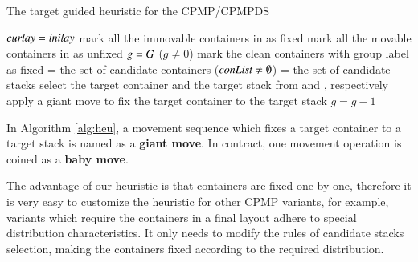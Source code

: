 \documentclass[review,3p,times,authoryear,12pt]{elsarticle}
\begin{document}
\begin{algorithm}[htbp]
	\caption{The target guided heuristic for the CPMP/CPMPDS}
	\label{alg:heu}
	\begin{codebox}
	\li $\id{curlay} = \id{inilay}$
    \li mark all the immovable containers in  as fixed
    \li mark all the movable containers in  as unfixed
    \li $\id{g} = G$
    \li \While ($g\neq0$)
    \li \Do
            mark the clean containers with group label  as fixed\label{heu:c}
    \li     {} = the set of candidate containers
    \li     \While($\id{conList} \neq \emptyset$)\label{heu:l}
    \li     \Do
                 = the set of candidate stacks
    \li         select the target container and the target stack from  and , respectively
    \li         apply a giant move to fix the target container to the target stack
            \End
    \li $g=g-1$
        \End
	\end{codebox}	
\end{algorithm}

In Algorithm \ref{alg:heu}, a movement sequence which fixes a target container to a target stack is named as a \textbf{giant move}. In contract, one movement operation is coined as a \textbf{baby move}.

The advantage of our heuristic is that containers are fixed one by one, therefore it is very easy to customize the heuristic for other CPMP variants, for example, variants which require the containers in a final layout adhere to special distribution characteristics. It only needs to modify the rules of candidate stacks selection, making the containers fixed according to the required distribution.
\end{document}

